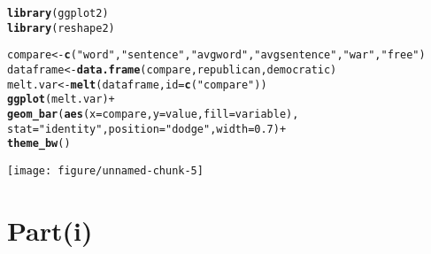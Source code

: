 \documentclass[english]{article}\usepackage[]{graphicx}\usepackage[]{color}
\makeatletter
\def\maxwidth{ %
  \ifdim\Gin@nat@width>\linewidth
    \linewidth
  \else
    \Gin@nat@width
  \fi
}
\newcommand{\hlnum}[1]{\textcolor[rgb]{0.686,0.059,0.569}{#1}}%
\newcommand{\hlstr}[1]{\textcolor[rgb]{0.192,0.494,0.8}{#1}}%
\newcommand{\hlopt}[1]{\textcolor[rgb]{0,0,0}{#1}}%
\newcommand{\hlstd}[1]{\textcolor[rgb]{0.345,0.345,0.345}{#1}}%
\newcommand{\hlkwb}[1]{\textcolor[rgb]{0.69,0.353,0.396}{#1}}%
\newcommand{\hlkwc}[1]{\textcolor[rgb]{0.333,0.667,0.333}{#1}}%
\newcommand{\hlkwd}[1]{\textcolor[rgb]{0.737,0.353,0.396}{\textbf{#1}}}%
\newenvironment{kframe}{%
 \def\at@end@of@kframe{}%
 \ifinner\ifhmode%
  \def\at@end@of@kframe{\end{minipage}}%
  \begin{minipage}{\columnwidth}%
 \fi\fi%
 \def\FrameCommand##1{\hskip\@totalleftmargin \hskip-\fboxsep
 \colorbox{shadecolor}{##1}\hskip-\fboxsep
     \hskip-\linewidth \hskip-\@totalleftmargin \hskip\columnwidth}%
 \MakeFramed {\advance\hsize-\width
   \@totalleftmargin\z@ \linewidth\hsize
   \@setminipage}}%
 {\par\unskip\endMakeFramed%
 \at@end@of@kframe}
\newenvironment{knitrout}{}{} %
\makeatother
\begin{document}
\begin{knitrout}
\begin{kframe}
\begin{alltt}
\hlkwd{library}\hlstd{(ggplot2)}
\hlkwd{library}\hlstd{(reshape2)}

\hlstd{compare}\hlkwb{<-}\hlkwd{c}\hlstd{(}\hlstr{"word"}\hlstd{,}\hlstr{"sentence"}\hlstd{,}\hlstr{"avgword"}\hlstd{,}\hlstr{"avgsentence"}\hlstd{,}\hlstr{"war"}\hlstd{,}\hlstr{"free"}\hlstd{)}
\hlstd{dataframe}\hlkwb{<-}\hlkwd{data.frame}\hlstd{(compare,republican,democratic)}
\hlstd{melt.var}\hlkwb{<-}\hlkwd{melt}\hlstd{(dataframe,}\hlkwc{id}\hlstd{=}\hlkwd{c}\hlstd{(}\hlstr{"compare"}\hlstd{))}
\hlkwd{ggplot}\hlstd{(melt.var)} \hlopt{+}
        \hlkwd{geom_bar}\hlstd{(}\hlkwd{aes}\hlstd{(}\hlkwc{x}\hlstd{=compare,} \hlkwc{y}\hlstd{=value,} \hlkwc{fill}\hlstd{=variable),}
        \hlkwc{stat}\hlstd{=}\hlstr{"identity"}\hlstd{,}\hlkwc{position}\hlstd{=}\hlstr{"dodge"}\hlstd{,}\hlkwc{width}\hlstd{=}\hlnum{0.7}\hlstd{)} \hlopt{+}
        \hlkwd{theme_bw}\hlstd{()}
\end{alltt}
\end{kframe}
\texttt{[image: figure/unnamed-chunk-5]} 

\end{knitrout}


\section*{Part(i)}
\end{document}
